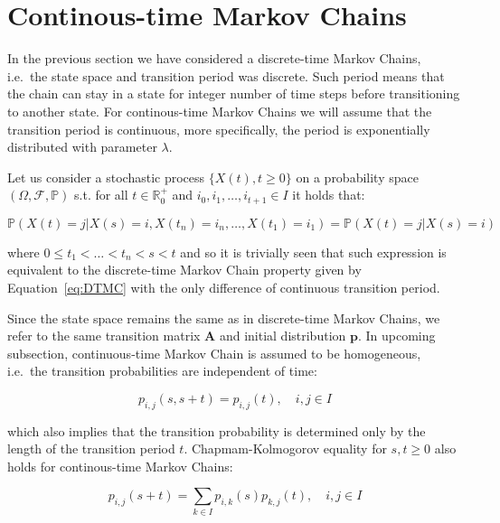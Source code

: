 \section{Continous-time Markov Chains} 

In the previous section we have considered a discrete-time Markov Chains, i.e.\ the state space and transition period was discrete. Such period means that 
the chain can stay in a state for integer number of time steps before transitioning to another state. 
For continous-time Markov Chains we will assume that the transition period is continuous, more specifically, the period is exponentially distributed with parameter $\lambda$.

Let us consider a stochastic process $\{X(t),t \geq 0\}$ on a probability space $(\Omega,\mathcal{F},\mathbb{P})$ s.t. for all $t \in \mathbb{R}_0^+$ and $i_0,i_1,\ldots,i_{t+1} \in I$ it holds that:

\begin{equation}
\mathbb{P}(X(t)=j|X(s)=i, X(t_n)=i_n,\ldots,X(t_1)=i_1) = \mathbb{P}(X(t)=j|X(s)=i)
\end{equation}

where $0 \leq t_1 < \ldots < t_n < s < t $ and so it is trivially seen that such expression is equivalent to the discrete-time Markov Chain property 
given by Equation~\ref{eq:DTMC} with the only difference of continuous transition period. \citep{Tolver2016}

Since the state space remains the same as in discrete-time Markov Chains, we refer to the same transition matrix $\textbf{A}$ and initial distribution $\textbf{p}$.
In upcoming subsection, continuous-time Markov Chain is assumed to be homogeneous, i.e.\ the transition probabilities are independent of time:

\begin{equation}
p_{i,j}(s,s+t) = p_{i,j}(t), \quad i,j \in I
\end{equation}

which also implies that the transition probability is determined only by the length of the transition period $t$. 
Chapmam-Kolmogorov equality for $s,t \geq 0$ also holds for continous-time Markov Chains:

\begin{equation}
p_{i,j}(s+t) = \sum\limits_{k \in I} p_{i,k}(s) p_{k,j}(t), \quad i,j \in I
\end{equation}

